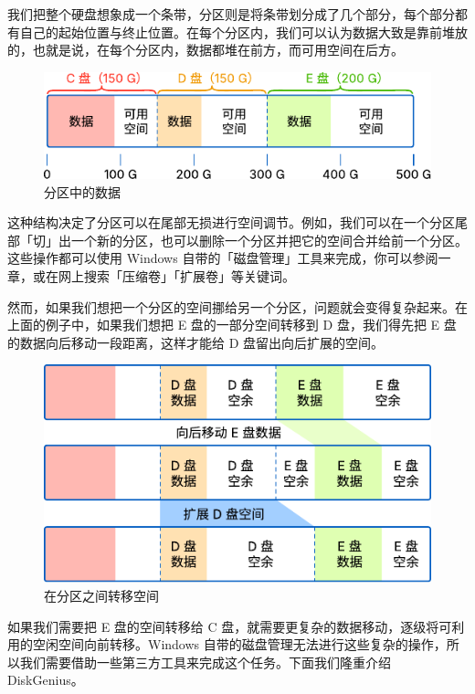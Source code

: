 {我们把整个硬盘想象成一个条带，分区则是将条带划分成了几个部分，每个部分都有自己的起始位置与终止位置。在每个分区内，我们可以认为数据大致是靠前堆放的，也就是说，在每个分区内，数据都堆在前方，而可用空间在后方。

\begin{figure}[htb!]
  \centering
  \includegraphics[width=.9\textwidth]{assets/advanced/Disk_partitions.pdf}
  \caption{分区中的数据}
  \label{fig:Disk_partitions}
\end{figure}

这种结构决定了分区可以在尾部无损进行空间调节。例如，我们可以在一个分区尾部「切」出一个新的分区，也可以删除一个分区并把它的空间合并给前一个分区。这些操作都可以使用 Windows 自带的「磁盘管理」工具来完成，你可以参阅一章，或在网上搜索「压缩卷」「扩展卷」等关键词。

然而，如果我们想把一个分区的空间挪给另一个分区，问题就会变得复杂起来。在上面的例子中，如果我们想把 E 盘的一部分空间转移到 D 盘，我们得先把 E 盘的数据向后移动一段距离，这样才能给 D 盘留出向后扩展的空间。

\begin{figure}[htb!]
  \centering
  \includegraphics[width=.7\textwidth]{assets/advanced/Move_space_from_partition_to_partition.pdf}
  \caption{在分区之间转移空间}
  \label{fig:Move_space_from_partition_to_partition}
\end{figure}

如果我们需要把 E 盘的空间转移给 C 盘，就需要更复杂的数据移动，逐级将可利用的空闲空间向前转移。Windows 自带的磁盘管理无法进行这些复杂的操作，所以我们需要借助一些第三方工具来完成这个任务。下面我们隆重介绍 DiskGenius。

}

